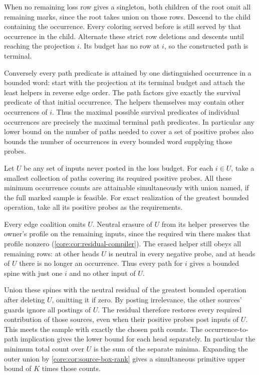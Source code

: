 When no remaining loss row gives a singleton,
both children of the root omit all remaining
marks, since the root takes union on those rows.
Descend to the child containing the occurrence.
Every coloring served before is still served by
that occurrence in the child. Alternate these
strict row deletions and descents until reaching
the projection $i$. Its budget has no row at
$i$, so the constructed path is terminal.

Conversely every path predicate is attained by
one distinguished occurrence in a bounded word:
start with the projection at its terminal budget
and attach the least helpers in reverse edge
order. The path factors give exactly the
survival predicate of that initial occurrence.
The helpers themselves may contain other
occurrences of $i$. Thus the maximal possible
survival predicates of individual occurrences
are precisely the maximal terminal path
predicates. In particular any lower bound on
the number of paths needed to cover a set of
positive probes also bounds the number of
occurrences in every bounded word supplying
those probes.

Let $U$ be any set of inputs never posted in the
loss budget. For each $i\in U$, take a smallest
collection of paths covering its required positive
probes. All these minimum occurrence counts are
attainable simultaneously with union named, if
the full marked sample is feasible. For exact
realization of the greatest bounded operation,
take all its positive probes as the requirements.

Every edge coalition omits $U$. Neutral erasure
of $U$ from its helper preserves the owner's
profile on the remaining inputs, since the required
win there makes that profile nonzero
(\cref{core:cor:residual-compiler}). The erased
helper still obeys all remaining rows: at other
heads $U$ is neutral in every negative probe,
and at heads of $U$ there is no longer an
occurrence. Thus every path for $i$ gives a
bounded spine with just one $i$ and no other
input of $U$.

Union these spines with the neutral residual
of the greatest bounded operation after deleting
$U$, omitting it if zero. By posting irrelevance,
the other sources' guards ignore all postings of
$U$. The residual therefore restores every
required contribution of those sources, even
when their positive probes post inputs of $U$.
This meets the sample with exactly the chosen
path counts. The occurrence-to-path implication
gives the lower bound for each head separately.
In particular the minimum total count over $U$
is the sum of the separate minima. Expanding the
outer union by \cref{core:cor:source-box-rank}
gives a simultaneous primitive upper bound of
$K$ times those counts.

